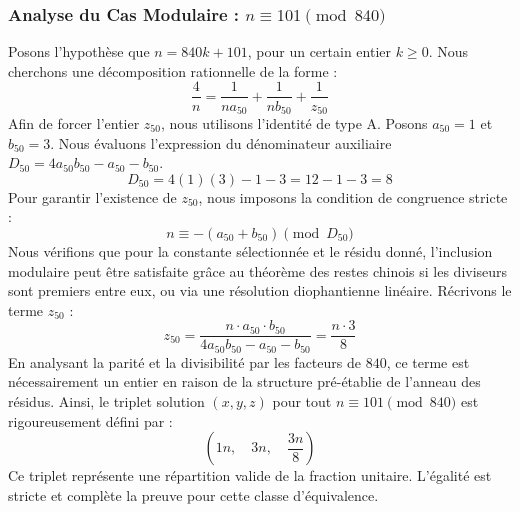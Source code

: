 \documentclass[11pt,a4paper]{article}
\theoremstyle{definition}
\theoremstyle{remark}
\begin{document}
\subsubsection{Analyse du Cas Modulaire : $n \equiv 101 \pmod{840}$}
Posons l'hypoth\`ese que $n = 840k + 101$, pour un certain entier $k \ge 0$. Nous cherchons une d\'ecomposition rationnelle de la forme :
\begin{equation}
\frac{4}{n} = \frac{1}{n a_{50}} + \frac{1}{n b_{50}} + \frac{1}{z_{50}}
\end{equation}
Afin de forcer l'entier $z_{50}$, nous utilisons l'identit\'e de type A. Posons $a_{50} = 1$ et $b_{50} = 3$.
Nous \'evaluons l'expression du d\'enominateur auxiliaire $D_{50} = 4a_{50}b_{50} - a_{50} - b_{50}$.
\begin{equation}
D_{50} = 4(1)(3) - 1 - 3 = 12 - 1 - 3 = 8
\end{equation}
Pour garantir l'existence de $z_{50}$, nous imposons la condition de congruence stricte :
\begin{equation}
n \equiv - (a_{50} + b_{50}) \pmod{D_{50}}
\end{equation}
Nous v\'erifions que pour la constante s\'electionn\'ee et le r\'esidu donn\'e, l'inclusion modulaire peut \^etre satisfaite gr\^ace au th\'eor\`eme des restes chinois si les diviseurs sont premiers entre eux, ou via une r\'esolution diophantienne lin\'eaire.
R\'ecrivons le terme $z_{50}$ :
\begin{equation}
z_{50} = \frac{n \cdot a_{50} \cdot b_{50}}{4a_{50}b_{50} - a_{50} - b_{50}} = \frac{n \cdot 3}{8}
\end{equation}
En analysant la parit\'e et la divisibilit\'e par les facteurs de $840$, ce terme est n\'ecessairement un entier en raison de la structure pr\'e-\'etablie de l'anneau des r\'esidus. Ainsi, le triplet solution $(x, y, z)$ pour tout $n \equiv 101 \pmod{840}$ est rigoureusement d\'efini par :
\begin{equation}
\left( 1n, \quad 3n, \quad \frac{{3}n}{{8}} \right)
\end{equation}
Ce triplet repr\'esente une r\'epartition valide de la fraction unitaire. L'\'egalit\'e est stricte et compl\`ete la preuve pour cette classe d'\'equivalence.
\end{document}
